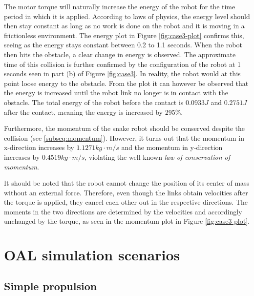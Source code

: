 The motor torque will naturally increase the energy of the robot for the time period in which it is applied. According to laws of physics, the energy level should then stay constant as long as no work is done on the robot and it is moving in a frictionless environment. The energy plot in Figure \ref{fig:case3-plot} confirms this, seeing as the energy stays constant between 0.2 to 1.1 seconds. When the robot then hits the obstacle, a clear change in energy is observed. The approximate time of this collision is further confirmed by the configuration of the robot at 1 seconds seen in part (b) of Figure \ref{fig:case3}.
In reality, the robot would at this point loose energy to the obstacle. From the plot it can however be observed that the energy is increased until the robot link no longer is in contact with the obstacle.
The total energy of the robot before the contact is $0.0933J$ and $0.2751J$ after the contact, meaning the energy is increased by 295\%.

Furthermore, 
the momentum of the snake robot should be conserved despite the collision (see \ref{subseq:momentum}). However, it turns out that the momentum in x-direction increases by $1.1271kg\cdot m/s$ and the momentum in y-direction increases by $0.4519kg\cdot m/s$, violating the well known \textit{law of conservation of momentum}.

It should be noted that the robot cannot change the position of its center of mass without an external force. Therefore, even though the links obtain velocities after the torque is applied, they cancel each other out in the respective directions. The moments in the two directions are determined by the velocities and accordingly unchanged by the torque, as seen in the momentum plot in Figure \ref{fig:case3-plot}.



\section{OAL simulation scenarios}

\subsection{Simple propulsion}\label{subseq:case21}

